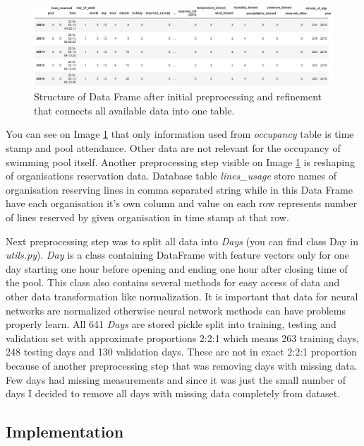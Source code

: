 \documentclass{article}
\begin{document}
\begin{figure}[h!]
\centering
\includegraphics[width=16cm]{imgs/dataframe_head}
\caption{Structure of Data Frame after initial preprocessing and refinement that connects all available data into one table.}
\label{fig:dataframe_structure}
\end{figure}

You can see on Image \ref{fig:dataframe_structure} that only information used from \emph{occupancy} table is time stamp and pool attendance. Other data are not relevant for the occupancy of swimming pool itself. Another preprocessing step visible on Image \ref{fig:dataframe_structure} is reshaping of organisations reservation data. Database table \emph{lines\_usage} store names of organisation reserving lines in comma separated string while in this Data Frame have each organisation it's own column and value on each row represents number of lines reserved by given organisation in time stamp at that row. 

Next preprocessing step was to split all data into \emph{Days} (you can find class Day in \emph{utils.py}). \emph{Day} is a class containing DataFrame with feature vectors only for one day starting one hour before opening and ending one hour after closing time of the pool. This class also contains several methods for easy access of data and other data transformation like normalization. It is important that data for neural networks are normalized otherwise neural network methods can have problems properly learn. All 641 \emph{Days} are stored pickle split into training, testing and validation set with approximate proportions 2:2:1 which means 263 training days, 248 testing days and 130 validation days. These are not in exact 2:2:1 proportion because of another preprocessing step that was removing days with missing data. Few days had missing measurements and since it was just the small number of days I decided to remove all days with missing data completely from dataset.

\subsection{Implementation}
\end{document}

